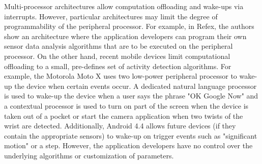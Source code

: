 Multi-processor architectures allow computation offloading and wake-ups via interrupts. However, particular architectures may limit the degree of programmability of the peripheral processor. For example, in Refex\cite{reflex}, the authors show an architecture where the application developers can program their own sensor data analysis algorithms that are to be executed on the peripheral processor. On the other hand, recent mobile devices limit computational offloading to a small, pre-defines set of activity detection algorithms. For example, the Motorola Moto X uses two low-power peripheral processor to wake-up the device when certain events occur. A dedicated natural language processor is used to wake-up the device when a user says the phrase "OK Google Now" and a contextual processor is used to turn on part of the screen when the device is taken out of a pocket or start the camera application when two twists of the wrist are detected. Additionally, Android 4.4 allows future devices (if they contain the appropriate sensors) to wake-up on trigger events such as "significant motion" or a step. However, the application developers have no control over the underlying algorithms or customization of parameters.
